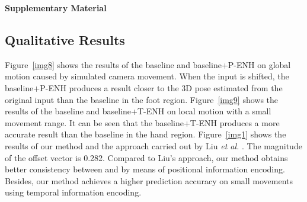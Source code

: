 \documentclass[sigconf]{acmart}
\begin{document}
\onecolumn
\begin{center}
\begin{Huge} 
\textbf{Supplementary Material}
\vspace{0.6cm}
\end{Huge}
\end{center}
\begin{multicols}{2}

















\setcounter{equation}{0}
\setcounter{figure}{0}
\setcounter{table}{0}
\setcounter{page}{1}
\setcounter{section}{0}
\makeatletter

\section{Qualitative Results}
Figure~\ref{img8} shows the results of the baseline and baseline+P-ENH on global motion caused by simulated camera movement. When the input is shifted, the baseline+P-ENH produces a result closer to the 3D pose estimated from the original input than the baseline in the foot region. Figure~\ref{img9} shows the results of the baseline and baseline+T-ENH on local motion with a small movement range. It can be seen that the baseline+T-ENH produces a more accurate result than the baseline in the hand region. Figure~\ref{img1} shows the results of our method and the approach carried out by Liu \textit{et al.} . The magnitude of the offset vector is 0.282. Compared to Liu's approach, our method obtains better consistency between  and  by means of positional information encoding. Besides, our method achieves a higher prediction accuracy on small movements using temporal information encoding.


\end{multicols}
\end{document}
